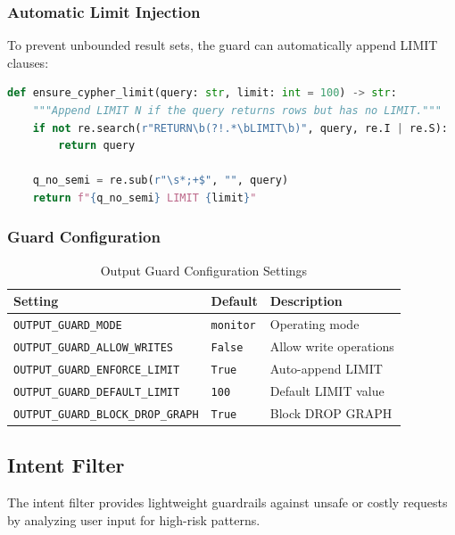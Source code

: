 \subsubsection{Automatic Limit Injection}

To prevent unbounded result sets, the guard can automatically append LIMIT clauses:

\begin{lstlisting}[language=Python,caption={Automatic LIMIT injection}]
def ensure_cypher_limit(query: str, limit: int = 100) -> str:
    """Append LIMIT N if the query returns rows but has no LIMIT."""
    if not re.search(r"RETURN\b(?!.*\bLIMIT\b)", query, re.I | re.S):
        return query
    
    q_no_semi = re.sub(r"\s*;+$", "", query)
    return f"{q_no_semi} LIMIT {limit}"
\end{lstlisting}

\subsubsection{Guard Configuration}

\begin{table}[ht]
\centering
\caption{Output Guard Configuration Settings}
\label{tab:output-guard-config}
\begin{tabular}{lll}
\hline
\textbf{Setting} & \textbf{Default} & \textbf{Description} \\
\hline
\texttt{OUTPUT\_GUARD\_MODE} & \texttt{monitor} & Operating mode \\
\texttt{OUTPUT\_GUARD\_ALLOW\_WRITES} & \texttt{False} & Allow write operations \\
\texttt{OUTPUT\_GUARD\_ENFORCE\_LIMIT} & \texttt{True} & Auto-append LIMIT \\
\texttt{OUTPUT\_GUARD\_DEFAULT\_LIMIT} & \texttt{100} & Default LIMIT value \\
\texttt{OUTPUT\_GUARD\_BLOCK\_DROP\_GRAPH} & \texttt{True} & Block DROP GRAPH \\
\hline
\end{tabular}
\end{table}

\subsection{Intent Filter}
\label{subsec:intent-filter}

The intent filter provides lightweight guardrails against unsafe or costly requests by analyzing user input for high-risk patterns.

